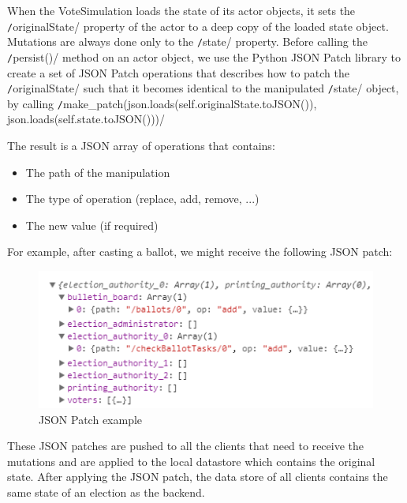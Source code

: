 When the VoteSimulation loads the state of its actor objects, it sets the \texttt/originalState/ property of the actor to a deep copy of the loaded state object. Mutations are always done only to the \texttt/state/ property. Before calling the \texttt/persist()/ method on an actor object, we use the Python JSON Patch library to create a set of JSON Patch operations that describes how to patch the \texttt/originalState/ such that it becomes identical to the manipulated \texttt/state/ object, by calling 
\texttt/make_patch(json.loads(self.originalState.toJSON()), json.loads(self.state.toJSON()))/

The result is a JSON array of operations that contains:
\begin{itemize}
	\item The path of the manipulation
	\item The type of operation (replace, add, remove, ...)
	\item The new value (if required)
\end{itemize}

For example, after casting a ballot, we might receive the following JSON patch:

\begin{figure}[h!]
\begin{center}
\includegraphics[scale=1]{assets/jsonpatchexample.png}
\caption{JSON Patch example}
\end{center}
\end{figure}

These JSON patches are pushed to all the clients that need to receive the mutations and are applied to the local datastore which contains the original state. After applying the JSON patch, the data store of all clients contains the same state of an election as the backend.

